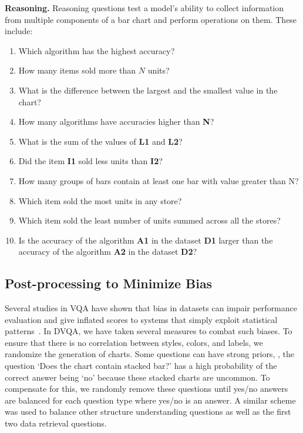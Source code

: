 \documentclass[10pt,twocolumn,letterpaper]{article}
\begin{document}
{\textbf{Reasoning.} Reasoning questions test a model's ability to collect information from multiple components of a bar chart  and perform operations on them. These include:

\begin{enumerate}[noitemsep, wide, labelwidth=!, labelindent=0pt]
\small
\item Which algorithm has the highest accuracy?
\item How many items sold more than $N$ units?
\item What is the difference between the largest and the smallest value in the chart?
\item How many algorithms have accuracies higher than \textbf{N}?
\item What is the sum of the values of \textbf{L1} and \textbf{L2}?
\item Did the item \textbf{I1} sold less units than \textbf{I2}?
\item How many groups of bars contain at least one bar with value greater than N?
\item Which item sold the most units in any store?
\item Which item sold the least number of units summed across all the stores?
\item Is the accuracy of the algorithm \textbf{A1} in the dataset \textbf{D1} larger than the accuracy of the algorithm \textbf{A2} in the dataset \textbf{D2}?
\end{enumerate}
}
\subsection{Post-processing to Minimize Bias}

Several studies in VQA have shown that bias in datasets can impair performance evaluation and give inflated scores to systems that simply exploit statistical patterns~\cite{jabri2016revisiting,kafle2017analysis,vqacp}. In DVQA, we have taken several measures to combat such biases. 
To ensure that there is no correlation between styles, colors, and labels, we randomize the generation of charts. Some questions can have strong priors, \eg, the question `Does the chart contain stacked bar?' has a high probability of the correct answer being `no' because these stacked charts are uncommon. To compensate for this, we randomly remove these questions until yes/no answers are balanced for each question type where yes/no is an answer. A similar scheme was used to balance other structure understanding questions as well as the first two data retrieval questions.
\end{document}
